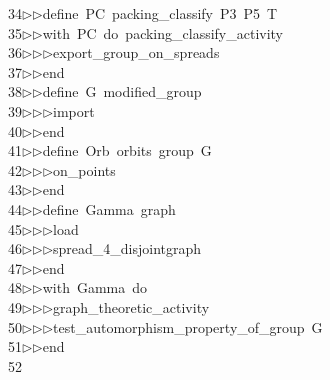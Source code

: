 \begin{tabbing}
34\>$\triangleright$\>$\triangleright$\>define\ PC\ packing\_classify\ P3\ P5\ T\ \\[0pt]
35\>$\triangleright$\>$\triangleright$\>with\ PC\ do\ packing\_classify\_activity\ \\[0pt]
36\>$\triangleright$\>$\triangleright$\>$\triangleright$\>export\_group\_on\_spreads\ \\[0pt]
37\>$\triangleright$\>$\triangleright$\>end\ \\[0pt]
38\>$\triangleright$\>$\triangleright$\>define\ G\ modified\_group\ \\[0pt]
39\>$\triangleright$\>$\triangleright$\>$\triangleright$\>import\ \\[0pt]
40\>$\triangleright$\>$\triangleright$\>end\ \\[0pt]
41\>$\triangleright$\>$\triangleright$\>define\ Orb\ orbits\ group\ G\ \\[0pt]
42\>$\triangleright$\>$\triangleright$\>$\triangleright$\>on\_points\ \\[0pt]
43\>$\triangleright$\>$\triangleright$\>end\ \\[0pt]
44\>$\triangleright$\>$\triangleright$\>define\ Gamma\ graph\ \\[0pt]
45\>$\triangleright$\>$\triangleright$\>$\triangleright$\>load\ \\[0pt]
46\>$\triangleright$\>$\triangleright$\>$\triangleright$\>spread\_4\_disjointgraph\ \\[0pt]
47\>$\triangleright$\>$\triangleright$\>end\ \\[0pt]
48\>$\triangleright$\>$\triangleright$\>with\ Gamma\ do\ \\[0pt]
49\>$\triangleright$\>$\triangleright$\>$\triangleright$\>graph\_theoretic\_activity\ \\[0pt]
50\>$\triangleright$\>$\triangleright$\>$\triangleright$\>test\_automorphism\_property\_of\_group\ G\ \\[0pt]
51\>$\triangleright$\>$\triangleright$\>end\ \\[0pt]
52\>\end{tabbing}
